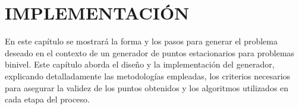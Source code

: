 \chapter{IMPLEMENTACIÓN}

En este capítulo se mostrará la forma y los pasos para generar el problema deseado en el contexto de un generador de puntos estacionarios para problemas binivel. Este capítulo aborda el diseño y la implementación del generador, explicando detalladamente las metodologías empleadas, los criterios necesarios para asegurar la validez de los puntos obtenidos y los algoritmos utilizados en cada etapa del proceso.


